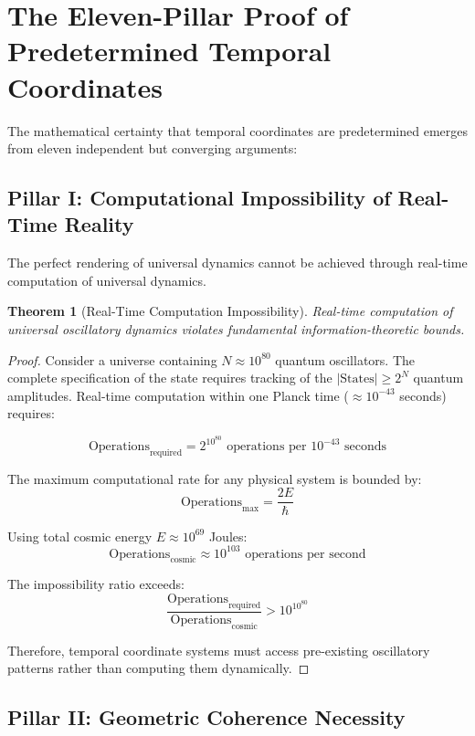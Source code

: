 \documentclass[12pt,a4paper]{article}
\newtheorem{theorem}{Theorem}
\begin{document}
\section{The Eleven-Pillar Proof of Predetermined Temporal Coordinates}

The mathematical certainty that temporal coordinates are predetermined emerges from eleven independent but converging arguments:

\subsection{Pillar I: Computational Impossibility of Real-Time Reality}

The perfect rendering of universal dynamics cannot be achieved through real-time computation of universal dynamics.

\begin{theorem}[Real-Time Computation Impossibility]
Real-time computation of universal oscillatory dynamics violates fundamental information-theoretic bounds.
\end{theorem}

\begin{proof}
Consider a universe containing $N \approx 10^{80}$ quantum oscillators. The complete specification of the state requires tracking of the $|\text{States}| \geq 2^N$ quantum amplitudes. Real-time computation within one Planck time ($\approx 10^{-43}$ seconds) requires:

$$\text{Operations}_{\text{required}} = 2^{10^{80}} \text{ operations per } 10^{-43} \text{ seconds}$$

The maximum computational rate for any physical system is bounded by:
$$\text{Operations}_{\text{max}} = \frac{2E}{\hbar}$$

Using total cosmic energy $E \approx 10^{69}$ Joules:
$$\text{Operations}_{\text{cosmic}} \approx 10^{103} \text{ operations per second}$$

The impossibility ratio exceeds:
$$\frac{\text{Operations}_{\text{required}}}{\text{Operations}_{\text{cosmic}}} > 10^{10^{80}}$$

Therefore, temporal coordinate systems must access pre-existing oscillatory patterns rather than computing them dynamically.
\end{proof}

\subsection{Pillar II: Geometric Coherence Necessity}
\end{document}
